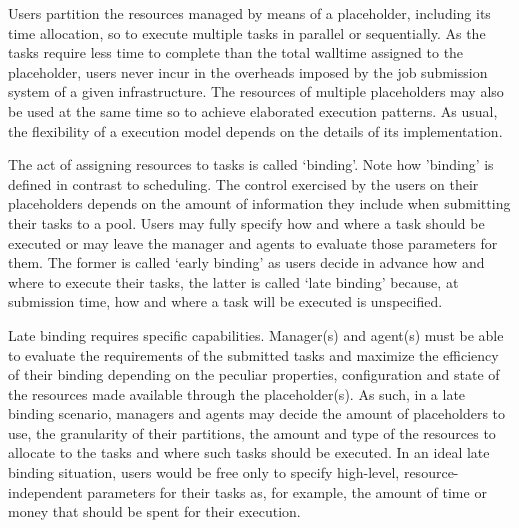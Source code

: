 \documentclass{sig-alternate}
\begin{document}


Users partition the resources managed by means of a placeholder,
including its time allocation, so to execute multiple tasks in
parallel or sequentially. As the tasks require less time to complete
than the total walltime assigned to the placeholder, users never incur
in the overheads imposed by the job submission system of a given
infrastructure. The resources of multiple placeholders may also be
used at the same time so to achieve elaborated execution patterns. As
usual, the flexibility of a \pilotjob execution model depends on the
details of its implementation.



  The act of
assigning resources to tasks is called `binding'. Note how 'binding'
is defined in contrast to scheduling.    The control exercised by
the users on their placeholders depends on the amount of information
they include when submitting their tasks to a pool. Users may fully
specify how and where a task should be executed or may leave the
manager and agents to evaluate those parameters for them. The former
is called `early binding' as users decide in advance how and where to
execute their tasks, the latter is called `late binding' because, at
submission time, how and where a task will be executed is unspecified.

Late binding requires specific capabilities. Manager(s) and agent(s)
must be able to evaluate the requirements of the submitted tasks and
maximize the efficiency of their binding depending on the peculiar
properties, configuration and state of the resources made available
through the placeholder(s). As such, in a late binding scenario,
managers and agents may decide the amount of placeholders to use, the
granularity of their partitions, the amount and type of the resources
to allocate to the tasks and where such tasks should be executed. In
an ideal late binding situation, users would be free only to specify
high-level, resource-independent parameters for their tasks as, for
example, the amount of time or money that should be spent for their
execution. 
\end{document}
